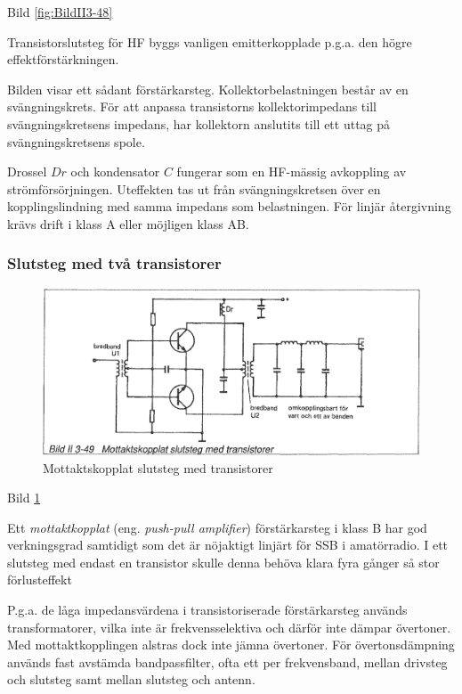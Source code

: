 Bild \ref{fig:BildII3-48}

Transistorslutsteg för HF byggs vanligen emitterkopplade p.g.a. den
högre effektförstärkningen.

Bilden visar ett sådant förstärkarsteg.  Kollektorbelastningen består
av en svängningskrets. För att anpassa transistorns kollektorimpedans
till svängningskretsens impedans, har kollektorn anslutits till ett
uttag på svängningskretsens spole.

Drossel \(Dr\) och kondensator \(C\) fungerar som en HF-mässig
avkoppling av strömförsörjningen. Uteffekten tas ut från
svängningskretsen över en kopplingslindning med samma impedans som
belastningen. För linjär återgivning krävs drift i klass A eller
möjligen klass AB.

\subsubsection{Slutsteg med två transistorer}

\begin{figure}[h]
\begin{center}
\includegraphics[width=14cm]{images/bild_2_3-49}
\caption{Mottaktskopplat slutsteg med transistorer}
\label{fig:BildII3-49}
\end{center}
\end{figure}

Bild \ref{fig:BildII3-49}

Ett \emph{mottaktkopplat} (eng. \emph{push-pull amplifier}) förstärkarsteg i
klass B har god verkningsgrad samtidigt som det är nöjaktigt linjärt för SSB i
amatörradio. I ett slutsteg med endast en transistor skulle denna
behöva klara fyra gånger så stor förlusteffekt

P.g.a. de låga impedansvärdena i transistoriserade förstärkarsteg
används transformatorer, vilka inte är frekvensselektiva och därför
inte dämpar övertoner. Med mottaktkopplingen alstras dock inte jämna
övertoner. För övertonsdämpning används fast avstämda bandpassfilter,
ofta ett per frekvensband, mellan drivsteg och slutsteg samt mellan
slutsteg och antenn.

